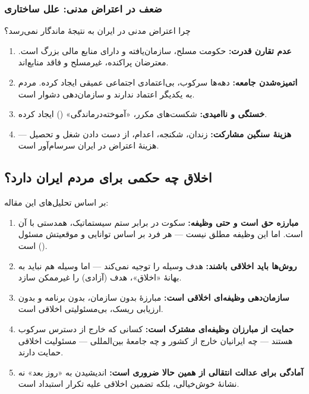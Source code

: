 \subsubsection{ضعف در اعتراض مدنی: علل ساختاری}
چرا اعتراض مدنی در ایران به نتیجهٔ ماندگار نمی‌رسد؟

\begin{enumerate}
\item \textbf{عدم تقارن قدرت:} حکومت مسلح، سازمان‌یافته و دارای منابع 
مالی بزرگ است. معترضان پراکنده، غیرمسلح و فاقد منابع‌اند.
\item \textbf{اتمیزه‌شدن جامعه:} دهه‌ها سرکوب، بی‌اعتمادی اجتماعی عمیقی 
ایجاد کرده. مردم به یکدیگر اعتماد ندارند و سازمان‌دهی دشوار است.
\item \textbf{خستگی و ناامیدی:} شکست‌های مکرر، «آموخته‌درماندگی» 
() ایجاد کرده.
\item \textbf{هزینهٔ سنگین مشارکت:} زندان، شکنجه، اعدام، از دست دادن 
شغل و تحصیل — هزینهٔ اعتراض در ایران سرسام‌آور است.
\end{enumerate}

\subsection{اخلاق چه حکمی برای مردم ایران دارد؟}

\begin{tcolorbox}[mybox, title={\textbf{حکم اخلاقی ترکیبی}}]
بر اساس تحلیل‌های این مقاله:
\begin{enumerate}[label=\textbf{\arabic*.}]
\item \textbf{مبارزه حق است و حتی وظیفه:} سکوت در برابر ستم سیستماتیک، 
همدستی با آن است. اما این وظیفه مطلق نیست — هر فرد بر اساس توانایی و 
موقعیتش مسئول است ().
\item \textbf{روش‌ها باید اخلاقی باشند:} هدف وسیله را توجیه نمی‌کند — 
اما وسیله هم نباید به بهانهٔ «اخلاق»، هدف (آزادی) را غیرممکن سازد.
\item \textbf{سازمان‌دهی وظیفه‌ای اخلاقی است:} مبارزهٔ بدون سازمان، 
بدون برنامه و بدون ارزیابی ریسک، بی‌مسئولیتی اخلاقی است.
\item \textbf{حمایت از مبارزان وظیفه‌ای مشترک است:} کسانی که خارج از 
دسترس سرکوب هستند — چه ایرانیان خارج از کشور و چه جامعهٔ بین‌المللی — 
مسئولیت اخلاقی حمایت دارند.
\item \textbf{آمادگی برای عدالت انتقالی از همین حالا ضروری است:} 
اندیشیدن به «روز بعد» نه نشانهٔ خوش‌خیالی، بلکه تضمین اخلاقی علیه 
تکرار استبداد است.
\end{enumerate}
\end{tcolorbox}



